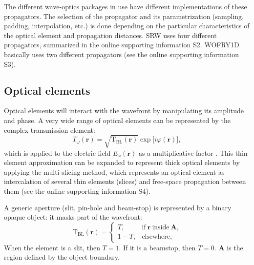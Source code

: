 \documentclass{iucr}
\begin{document}
The different wave-optics packages in use have different implementations of these propagators. The selection of the propagator and its parametrization (sampling, padding, interpolation, etc.) is done depending on the particular characteristics of the optical element and propagation distances. SRW uses four different propagators, summarized in the online supporting information S2. WOFRY1D basically uses two different propagators (see the online supporting information S3).   

\subsection{Optical elements}\label{sec:OE}

Optical elements will interact with the wavefront by manipulating its amplitude and phase. A very wide range of optical elements can be represented by the complex transmission element:
 \begin{equation}\label{eq:trans_el}
T_\omega(\textbf{r})=\sqrt{\mathrm{T}_\mathrm{BL}(\textbf{r})}\exp{\big[ i\varphi(\textbf{r})\big]},
\end{equation}
which is applied to the electric field $E_\omega(\textbf{r})$ as a multiplicative factor \cite{Cloetens_1996}. This thin element approximation can be expanded to represent thick optical elements by applying the multi-slicing method, which represents an optical element as intercalation of several thin elements (slices) and free-space propagation between them \cite{paganin_book, Li2017, Munro2019} (see the online supporting information S4). 

A generic aperture (slit, pin-hole and beam-stop) is represented by a binary opaque object: it masks part of the wavefront:
\begin{equation}\label{eq:slit}
    \mathrm{T}_{\text{BL}}(\textbf{r}) = 
        \begin{cases}
      T, & \text{if}~\textbf{r}~\text{inside}~\textbf{A},\\
      1-T, &\text{elsewhere},
        \end{cases}
\end{equation}
When the element is a slit, then $T=1$. If it is a beamstop, then $T=0$. $\textbf{A}$ is the region defined by the object boundary. 
\end{document}

